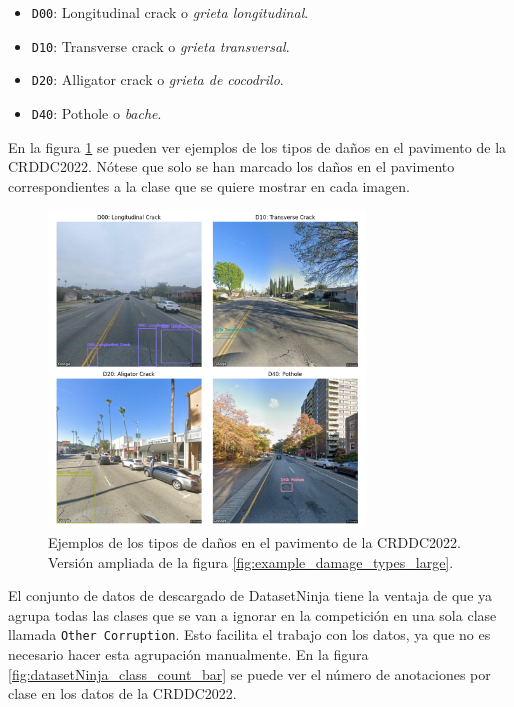 \begin{itemize}
    \item \texttt{D00}: Longitudinal crack o \textit{grieta longitudinal}.
    \item \texttt{D10}: Transverse crack o \textit{grieta transversal}.
    \item \texttt{D20}: Alligator crack o \textit{grieta de cocodrilo}.
    \item \texttt{D40}: Pothole o \textit{bache}.
\end{itemize}

En la figura \ref{fig:example_damage_types} se pueden ver ejemplos de los tipos de daños en el pavimento de la CRDDC2022. Nótese que solo se han marcado los daños en el pavimento correspondientes a la clase que se quiere mostrar en cada imagen.

\begin{figure}[H]
    \centering
    \includegraphics[width=0.75\textwidth]{img/example_damage_types_grid.png}
    \caption{Ejemplos de los tipos de daños en el pavimento de la CRDDC2022. Versión ampliada de la figura \ref{fig:example_damage_types_large}.}
    \label{fig:example_damage_types}
\end{figure}

El conjunto de datos de descargado de DatasetNinja tiene la ventaja de que ya agrupa todas las clases que se van a ignorar en la competición en una sola clase llamada \texttt{Other Corruption}. Esto facilita el trabajo con los datos, ya que no es necesario hacer esta agrupación manualmente. En la figura \ref{fig:datasetNinja_class_count_bar} se puede ver el número de anotaciones por clase en los datos de la CRDDC2022.

